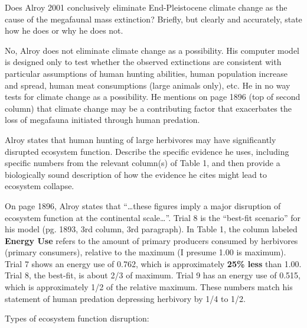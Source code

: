 \documentclass[11pt]{exam}
\begin{document}
\begin{questions}

\question[5]
Does Alroy 2001 conclusively eliminate End-Pleistocene climate change
as the cause of the megafaunal mass extinction? Briefly, but clearly and
accurately, state how he does or why he does not.

\ifprintanswers
No, Alroy does not eliminate climate change as a possibility. His
computer model is designed only to test whether the observed extinctions
are consistent with particular assumptions of human hunting abilities,
human population increase and spread, human meat consumptions (large
animals only), etc. He in no way tests for climate change as a
possibility. He mentions on page 1896 (top of second column) that
climate change may be a contributing factor that exacerbates the loss of
megafauna initiated through human predation.
\else{}
\fi

\question[5]
Alroy states that human hunting of large herbivores may have
significantly disrupted ecosystem function. Describe the specific
evidence he uses, including specific numbers from the relevant column(s)
of Table 1, and then provide a biologically sound description of how the
evidence he cites might lead to ecosystem collapse.
  
\ifprintanswers
On page 1896, Alroy states that ``\dots these figures imply a major
disruption of ecosystem function at the continental scale\dots''. Trial
8 is the ``best-fit scenario'' for his model (pg. 1893, 3rd column, 3rd
paragraph). In Table 1, the column labeled \textbf{Energy Use} refers to
the amount of primary producers consumed by herbivores (primary
consumers), relative to the maximum (I presume 1.00 is maximum). Trial 7
shows an energy use of 0.762, which is approximately \textbf{25\% less}
than 1.00. Trial 8, the best-fit, is about 2/3 of maximum. Trial 9 has
an energy use of 0.515, which is approximately 1/2 of the relative
maximum. These numbers match his statement of human predation depressing
herbivory by 1/4 to 1/2.

Types of ecosystem function disruption:


\end{questions}
\end{document}
